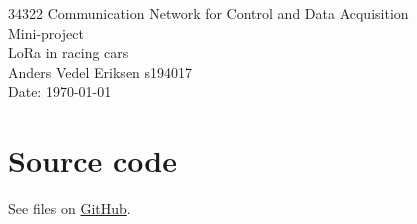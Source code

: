 \documentclass{article}
\begin{document}
\begin{minipage}{\textwidth}
  \Large
  \centering
  {\large 34322 Communication Network for Control and Data Acquisition\\}
  Mini-project\\
  LoRa in racing cars\\
  Anders Vedel Eriksen s194017\\
  Date: \today
  \vspace{1cm}
\end{minipage}





\newpage

\section*{Source code}
See files on {\color{red}\href{https://github.com/averiksen/LoRa-mini-projekt}{GitHub}}.

\printbibliography
\end{document}
